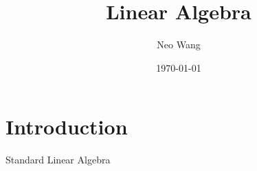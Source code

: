 \documentclass{article}
\title{Linear Algebra}
\date{\today}
\author{Neo Wang}
\begin{document}
\maketitle


\section{Introduction}
Standard Linear Algebra



\end{document}

